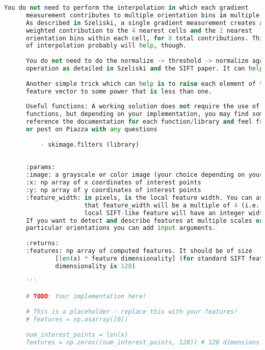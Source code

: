 \begin{lstlisting}[caption={student.py}, label={lst:code-example}, captionpos=t, language=python]
      You do not need to perform the interpolation in which each gradient
      measurement contributes to multiple orientation bins in multiple cells
      As described in Szeliski, a single gradient measurement creates a
      weighted contribution to the 4 nearest cells and the 2 nearest
      orientation bins within each cell, for 8 total contributions. This type
      of interpolation probably will help, though.
  
      You do not need to do the normalize -> threshold -> normalize again
      operation as detailed in Szeliski and the SIFT paper. It can help, though.
  
      Another simple trick which can help is to raise each element of the final
      feature vector to some power that is less than one.
  
      Useful functions: A working solution does not require the use of all of these
      functions, but depending on your implementation, you may find some useful. Please
      reference the documentation for each function/library and feel free to come to hours
      or post on Piazza with any questions
  
          - skimage.filters (library)
  
  
      :params:
      :image: a grayscale or color image (your choice depending on your implementation)
      :x: np array of x coordinates of interest points
      :y: np array of y coordinates of interest points
      :feature_width: in pixels, is the local feature width. You can assume
                      that feature_width will be a multiple of 4 (i.e. every cell of your
                      local SIFT-like feature will have an integer width and height).
      If you want to detect and describe features at multiple scales or
      particular orientations you can add input arguments.
  
      :returns:
      :features: np array of computed features. It should be of size
              [len(x) * feature dimensionality] (for standard SIFT feature
              dimensionality is 128)
  
      '''
  
      # TODO: Your implementation here!
  
      # This is a placeholder - replace this with your features!
      # features = np.asarray([0])
  
      num_interest_points = len(x)
      features = np.zeros((num_interest_points, 128)) # 128 dimensions for SIFT-like descriptor
  

\end{lstlisting}
